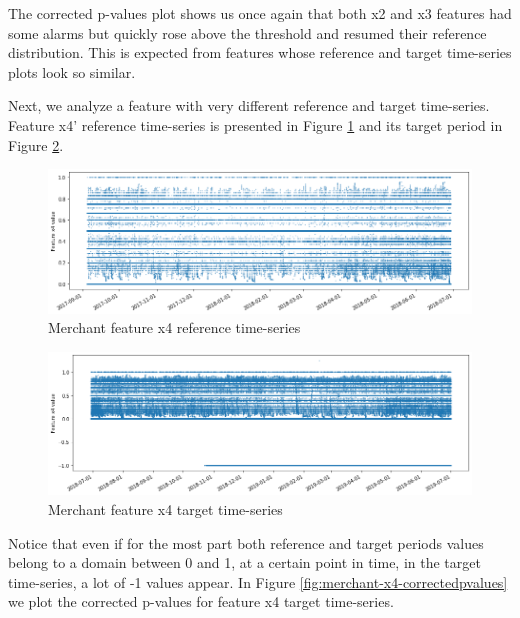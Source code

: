 The corrected p-values plot shows us once again that both x2 and x3 features had some alarms but quickly rose above the threshold and resumed their reference distribution. This is expected from features whose reference and target time-series plots look so similar.

Next, we analyze a feature with very different reference and target time-series. Feature x4' reference time-series is presented in Figure \ref{fig:merchant-x4-reference} and its target period in Figure \ref{fig:merchant-x4-target}.
\begin{figure}[!htb]
    \begin{center}
      \includegraphics[scale=0.5]{figures/merchant-x4-reference.png}
      \caption{Merchant feature x4 reference time-series}
      \label{fig:merchant-x4-reference}
    \end{center}
\end{figure}
\begin{figure}[!htb]
    \begin{center}
      \includegraphics[scale=0.5]{figures/merchant-x4-target.png}
      \caption{Merchant feature x4 target time-series}
      \label{fig:merchant-x4-target}
    \end{center}
\end{figure}
Notice that even if for the most part both reference and target periods values belong to a domain between 0 and 1, at a certain point in time, in the target time-series, a lot of -1 values appear. In Figure \ref{fig:merchant-x4-correctedpvalues} we plot the corrected p-values for feature x4 target time-series.
